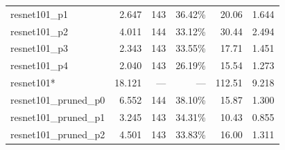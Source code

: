 \begin{table}[]
\begin{tabular}{@{}lrrrrr@{}}
resnet101\_p1                                        & 2.647                                                           & 143            & 36.42\%            & 20.06                                                             & 1.644                                                                      \\
resnet101\_p2                                        & 4.011                                                           & 144            & 33.12\%            & 30.44                                                             & 2.494                                                                      \\
resnet101\_p3                                        & 2.343                                                           & 143            & 33.55\%            & 17.71                                                             & 1.451                                                                      \\
resnet101\_p4                                        & 2.040                                                           & 143            & 26.19\%            & 15.54                                                             & 1.273                                                                      \\
resnet101*                                           & 18.121                                                          & ---            & ---                & 112.51                                                            & 9.218                                                                      \\
resnet101\_pruned\_p0                                & 6.552                                                           & 144            & 38.10\%            & 15.87                                                             & 1.300                                                                      \\
resnet101\_pruned\_p1                                & 3.245                                                           & 143            & 34.31\%            & 10.43                                                             & 0.855                                                                      \\
resnet101\_pruned\_p2                                & 4.501                                                           & 143            & 33.83\%            & 16.00                                                             & 1.311                                                                      \\

\end{tabular}
\end{table}
